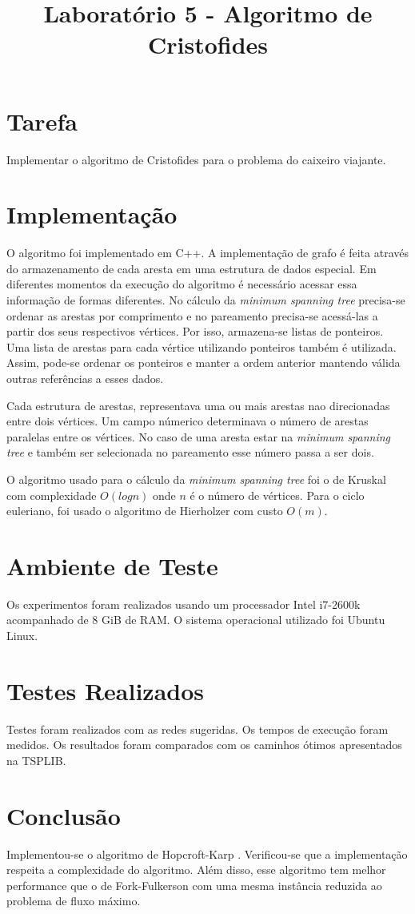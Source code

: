 \documentclass{iiufrgs}
\title{Laboratório 5 - Algoritmo de Cristofides}
\author{}{Thiago Bell}
\begin{document}
\maketitle

\setcounter{chapter}{1}

\section{Tarefa}
Implementar o algoritmo de Cristofides para o problema do caixeiro viajante.

\section{Implementaç\~ao}
O algoritmo foi implementado em C++. A implementação de grafo é feita através do
armazenamento de cada aresta em uma estrutura de dados especial. Em diferentes 
momentos da execução do algoritmo é necessário acessar essa informação de formas
diferentes. No cálculo da \textit{minimum spanning 
tree} precisa-se ordenar as arestas por comprimento e no pareamento precisa-se
acessá-las a partir dos seus respectivos vértices. Por isso, armazena-se listas de ponteiros.
Uma lista de arestas para cada vértice utilizando ponteiros também é utilizada. 
Assim, pode-se ordenar os ponteiros e manter a ordem anterior mantendo válida 
outras referências a esses dados.

Cada estrutura de arestas, representava uma ou mais arestas nao direcionadas entre dois vértices.
Um campo númerico determinava o número de arestas paralelas entre os vértices. No caso de uma aresta
estar na \textit{minimum spanning tree} e também ser selecionada no pareamento esse número passa a ser dois.

O algoritmo usado para o cálculo da \textit{minimum spanning tree} foi o de Kruskal com complexidade $O(log n)$
onde $n$ é o número de vértices. Para o ciclo euleriano, foi usado o algoritmo de Hierholzer com custo $O(m)$.



\section{Ambiente de Teste}
Os experimentos foram realizados usando um processador Intel  i7-2600k 
acompanhado de 8 GiB de RAM. 
O sistema operacional utilizado foi Ubuntu Linux.

\section{Testes Realizados}
Testes foram realizados com as redes sugeridas. Os tempos de execução foram medidos. Os resultados foram comparados com os caminhos ótimos apresentados na TSPLIB.


\section{}



\section{Conclus\~ao}
Implementou-se o algoritmo de Hopcroft-Karp . Verificou-se que a implementação respeita a
complexidade do algoritmo. Além disso, esse algoritmo tem melhor performance que o de Fork-Fulkerson com uma mesma instância reduzida ao problema de fluxo máximo.
\end{document}
